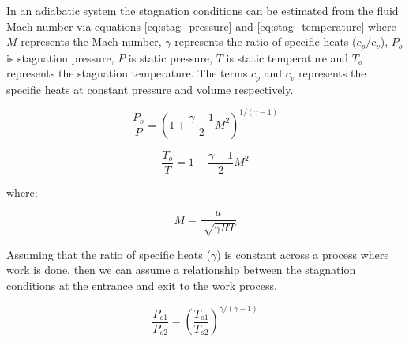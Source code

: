 In an adiabatic system the stagnation conditions can be estimated from the fluid Mach number via equations \ref{eq:stag_pressure} 
and \ref{eq:stag_temperature} where $M$ represents the Mach number, $\gamma$ represents the ratio of specific heats ($c_p/c_v$), $P_o$ 
is stagnation pressure, $P$ is static pressure, $T$ is static temperature and $T_o$ represents the stagnation temperature.
The terms $c_p$ and $c_v$ represents the specific heats at constant pressure and volume respectively.  

\begin{equation}
\label{eq:stag_pressure}
\frac{P_o}{P}=\left(1 + \frac{\gamma - 1}{2}M^2\right)^{1/\left(\gamma-1\right)}
\end{equation}

\begin{equation}
\label{eq:stag_temperature}
\frac{T_o}{T}=1 + \frac{\gamma-1}{2}M^2
\end{equation}

\noindent where;

\begin{equation}
\label{eq:mach}
M = \frac{u}{\sqrt[]{\gamma R T}}
\end{equation}

\noindent Assuming that the ratio of specific heats ($\gamma$) is constant across a 
process where work is done, then we can assume a relationship between
the stagnation conditions at the entrance and exit to the work process.

\begin{equation}
\label{eq:stag}
\frac{P_{o1}}{P_{o2}}=\left(\frac{T_{o1}}{T_{o2}}\right)^{\gamma/\left(\gamma-1\right)}
\end{equation}

